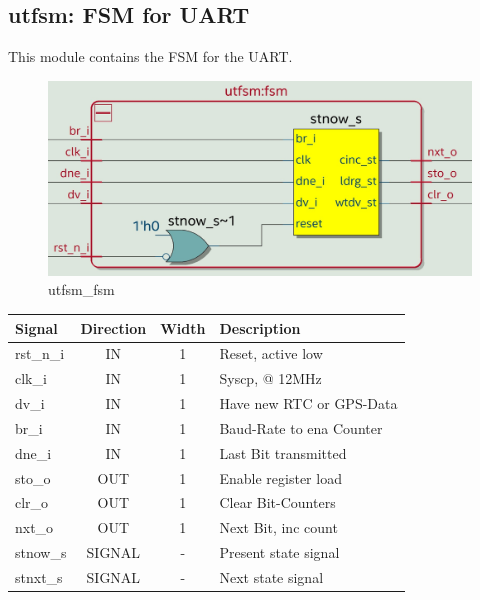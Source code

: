 \documentclass[12pt,a4 paper] {report}
\begin{document}
\subsection{utfsm: FSM for UART}
This module contains the FSM for the UART.
\begin{figure}[h]
	\centering	
	\includegraphics[scale=0.2]{../png/utfsm_fsm.png}
	\caption{utfsm\_fsm}
\end{figure}
\begin{center}
	\begin{tabular}{ | p{2cm} | c | c | p{5cm} |}
		\hline
		\textbf{Signal} & \textbf{Direction} & \textbf{Width} & \textbf{Description} \\
		\hline
		\hline
		rst\_n\_i & IN & 1 & Reset, active low \\
		\hline
		clk\_i & IN & 1 & Syscp, @ 12MHz \\
		\hline
		dv\_i & IN & 1 & Have new RTC or GPS-Data \\
		\hline
		br\_i & IN & 1 & Baud-Rate to ena Counter \\
		\hline
		dne\_i & IN & 1 & Last Bit transmitted \\
		\hline
		sto\_o & OUT & 1 & Enable register load \\
		\hline
		clr\_o & OUT & 1 & Clear Bit-Counters \\
		\hline
		nxt\_o & OUT & 1 & Next Bit, inc count \\
		\hline
		\hline
		stnow\_s & SIGNAL & - & Present state signal \\
		\hline
		stnxt\_s & SIGNAL & - & Next state signal \\
		\hline
	\end{tabular}
\end{center}

\newpage
\end{document}
